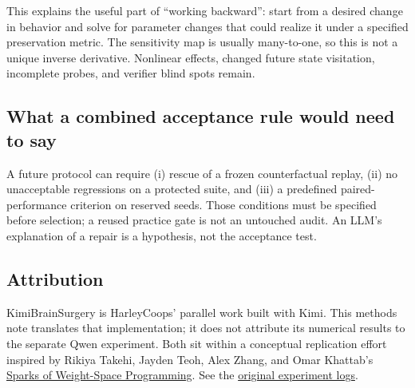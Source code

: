 \documentclass[11pt]{article}
\begin{document}
This explains the useful part of ``working backward'': start from a desired
change in behavior and solve for parameter changes that could realize it under
a specified preservation metric. The sensitivity map is usually many-to-one,
so this is not a unique inverse derivative. Nonlinear effects, changed future
state visitation, incomplete probes, and verifier blind spots remain.

\subsection*{What a combined acceptance rule would need to say}
A future protocol can require (i) rescue of a frozen counterfactual replay,
(ii) no unacceptable regressions on a protected suite, and (iii) a predefined
paired-performance criterion on reserved seeds. Those conditions must be
specified before selection; a reused practice gate is not an untouched audit.
An LLM's explanation of a repair is a hypothesis, not the acceptance test.

\subsection*{Attribution}
KimiBrainSurgery is HarleyCoops' parallel work built with Kimi. This methods
note translates that implementation; it does not attribute its numerical
results to the separate Qwen experiment. Both sit within a conceptual
replication effort inspired by Rikiya Takehi, Jayden Teoh, Alex Zhang, and Omar
Khattab's \href{https://rikiyat.github.io/blog/weight-space-programming/}{Sparks of Weight-Space Programming}.
See the \href{https://github.com/RikiyaT/lm_understand-logs/tree/main/exp1_which_game}{original experiment logs}.

\clearpage
\normalsize
\appendix
\end{document}
